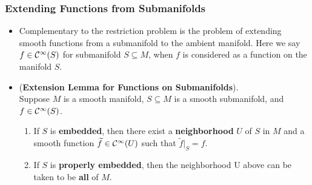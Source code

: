 \documentclass[11pt]{article}
\begin{document}
\subsubsection{Extending Functions from Submanifolds}
\begin{itemize}
\item \begin{remark}
Complementary to the restriction problem is the problem of extending smooth functions from a submanifold to the ambient manifold. Here we say $f \in {\mathcal C}^{\infty}(S)$ for submanifold $S\subseteq M$, when $f$ is considered as a function on the manifold $S$.
\end{remark}

\item \begin{lemma} (\textbf{Extension Lemma for Functions on Submanifolds}). \\
Suppose $M$ is a smooth manifold, $S\subseteq M$ is a smooth submanifold, and $f \in {\mathcal C}^{\infty}(S)$.
\begin{enumerate}
\item  If $S$ is \textbf{embedded}, then there exist a \textbf{neighborhood} $U$ of $S$ in $M$ and a smooth
function $\widetilde{f} \in  {\mathcal C}^{\infty}(U)$ such that $\widetilde{f}|_{S} = f$.
\item If $S$ is \textbf{properly embedded}, then the neighborhood U above can be taken to be \textbf{all} of $M$. 
\end{enumerate}
\end{lemma}
\end{itemize}
\end{document}

